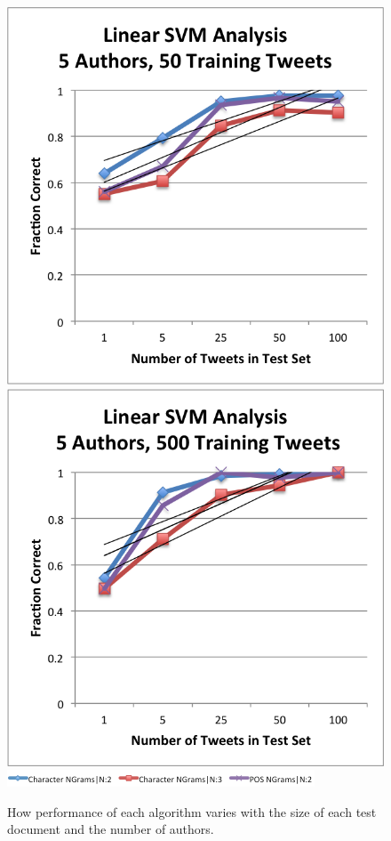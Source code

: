\documentclass[pageno]{jpaper}
\begin{document}
\begin{figure}[h!]
\begin{center}
\includegraphics*[scale=.75]{LinearSVMVaryTest5Auth50Train}
\includegraphics*[scale=.75]{LinearSVMVaryTest5Auth500Train}
\includegraphics*{4graphLegend}
\end{center}
\caption{How performance of each algorithm varies with the size of each test document and the number of authors.}
\label{fig:VaryingTest}
\end{figure}
\end{document}
